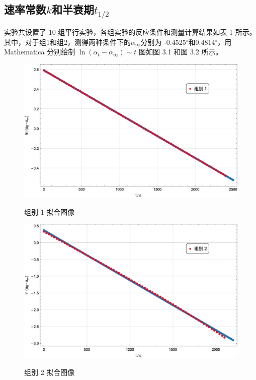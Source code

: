 \documentclass[12pt]{ctexart}
\numberwithin{equation}{section}
\begin{document}
\subsection{\texorpdfstring{速率常数$k$和半衰期$t_{1/2}$}{速率常数和半衰期}}

实验共设置了 10 组平行实验，各组实验的反应条件和测量计算结果如表 1
所示。其中，对于组1和组2，测得两种条件下的$\alpha_{\infty}$分别为
-0.4525$^\circ$和0.4814$^\circ$，用 Mathematica 分别绘制
$\ln(\alpha_t-\alpha_{\infty}) \sim t$ 图如图 3.1 和图 3.2 所示。

\begin{figure}[!h]
\begin{minipage}[t]{0.5\linewidth}
    \centering
    \includegraphics[scale=0.29]{first.jpg}
    \label{fig:first}
    \caption{组别 1 拟合图像}
\end{minipage}
\begin{minipage}[t]{0.5\linewidth}
    \centering
    \includegraphics[scale=0.29]{second.jpg}
    \label{fig:second}
    \caption{组别 2 拟合图像}
\end{minipage}
\end{figure}
\end{document}
